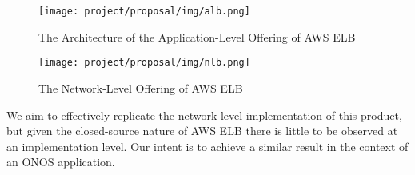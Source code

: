 \begin{figure}[H]
    \centering
    \texttt{[image: project/proposal/img/alb.png]}
    \caption{The Architecture of the Application-Level Offering of AWS ELB}
    \label{fig:app_level}
\end{figure}

\begin{figure}[H]
    \centering
    \texttt{[image: project/proposal/img/nlb.png]}
    \caption{The Network-Level Offering of AWS ELB}
    \label{fig:net_level}
\end{figure}

We aim to effectively replicate the network-level implementation of this product, but given the closed-source nature of AWS ELB there is little to be observed at an implementation level. Our intent is to achieve a similar result in the context of an ONOS application.


